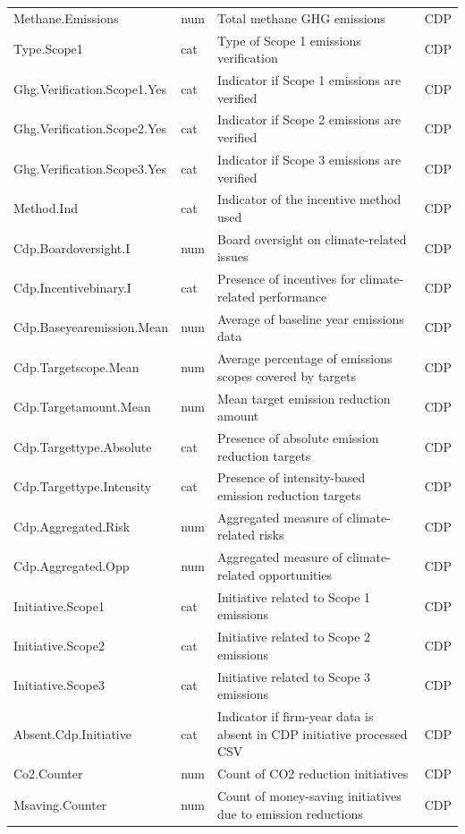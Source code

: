 \begin{longtable}{lp{1cm}p{6cm}p{1.1cm}}
    Methane.Emissions & num & Total methane GHG emissions & CDP  \\
    Type.Scope1 & cat & Type of Scope 1 emissions verification & CDP \\
    Ghg.Verification.Scope1.Yes & cat & Indicator if Scope 1 emissions are verified & CDP \\
    Ghg.Verification.Scope2.Yes & cat & Indicator if Scope 2 emissions are verified & CDP \\
    Ghg.Verification.Scope3.Yes & cat & Indicator if Scope 3 emissions are verified & CDP \\
    Method.Ind & cat & Indicator of the incentive method used & CDP \\
    Cdp.Boardoversight.I & num & Board oversight on climate-related issues & CDP \\
    Cdp.Incentivebinary.I & cat & Presence of incentives for climate-related performance & CDP \\
    Cdp.Baseyearemission.Mean & num & Average of baseline year emissions data & CDP \\
    Cdp.Targetscope.Mean & num & Average percentage of emissions scopes covered by targets & CDP \\
    Cdp.Targetamount.Mean & num & Mean target emission reduction amount & CDP \\
    Cdp.Targettype.Absolute & cat & Presence of absolute emission reduction targets & CDP \\
    Cdp.Targettype.Intensity & cat & Presence of intensity-based emission reduction targets & CDP \\
    Cdp.Aggregated.Risk & num & Aggregated measure of climate-related risks & CDP \\
    Cdp.Aggregated.Opp & num & Aggregated measure of climate-related opportunities & CDP \\
    Initiative.Scope1 & cat & Initiative related to Scope 1 emissions & CDP \\
    Initiative.Scope2 & cat & Initiative related to Scope 2 emissions & CDP \\
    Initiative.Scope3 & cat & Initiative related to Scope 3 emissions & CDP \\
    Absent.Cdp.Initiative & cat & Indicator if firm-year data is absent in CDP initiative processed CSV & CDP \\
    Co2.Counter & num & Count of CO2 reduction initiatives & CDP \\
    Msaving.Counter & num & Count of money-saving initiatives due to emission reductions & CDP \\

\end{longtable}
